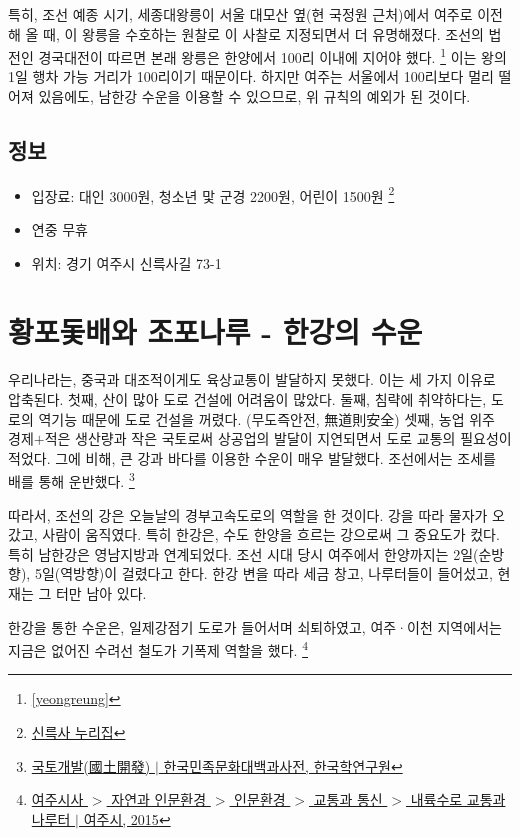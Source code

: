 특히, 조선 예종 시기, 세종대왕릉이 서울 대모산 옆(현 국정원 근처)에서 여주로 이전해 올 때,
이 왕릉을 수호하는 원찰로 이 사찰로 지정되면서 더 유명해졌다.
조선의 법전인 경국대전이 따르면 본래 왕릉은 한양에서 100리 이내에 지어야 했다. 
\footnote{\ref{yeongreung}}
이는 왕의 1일 행차 가능 거리가 100리이기 때문이다.
하지만 여주는 서울에서 100리보다 멀리 떨어져 있음에도, 남한강 수운을 이용할 수 있으므로,
위 규칙의 예외가 된 것이다.

\subsection{정보}
\begin{itemize}
    \item 입장료: 대인 3000원, 청소년 맟 군경 2200원, 어린이 1500원 
    \footnote{\href{http://www.silleuksa.org/}{신륵사 누리집}}
    \item 연중 무휴
    \item 위치: 경기 여주시 신륵사길 73-1
\end{itemize}

\section{황포돛배와 조포나루 - 한강의 수운}

우리나라는, 중국과 대조적이게도 육상교통이 발달하지 못했다. 이는 세 가지 이유로 압축된다.
첫째, 산이 많아 도로 건설에 어려움이 많았다. 
둘째, 침략에 취약하다는, 도로의 역기능 때문에 도로 건설을 꺼렸다. (무도즉안전, 無道則安全)
셋째, 농업 위주 경제$+$적은 생산량과 작은 국토로써 상공업의 발달이 지연되면서 도로 교통의 필요성이 적었다.
그에 비해, 큰 강과 바다를 이용한 수운이 매우 발달했다. 조선에서는 조세를 배를 통해 운반했다. 
\footnote{\href{http://encykorea.aks.ac.kr/Contents/Item/E0006539}{국토개발(國土開發) $|$ 한국민족문화대백과사전, 한국학연구원}}


따라서, 조선의 강은 오늘날의 경부고속도로의 역할을 한 것이다. 강을 따라 물자가 오갔고, 사람이 움직였다.
특히 한강은, 수도 한양을 흐르는 강으로써 그 중요도가 컸다. 특히 남한강은 영남지방과 연계되었다. 
조선 시대 당시 여주에서 한양까지는 2일(순방향), 5일(역방향)이 걸렸다고 한다.
한강 변을 따라 세금 창고, 나루터들이 들어섰고, 현재는 그 터만 남아 있다.


한강을 통한 수운은, 일제강점기 도로가 들어서며 쇠퇴하였고, 
여주·이천 지역에서는 지금은 없어진 수려선 철도가 기폭제 역할을 했다.
\footnote{ \href{https://www.yeoju.go.kr/history/jsp/Theme/Theme.jsp?BC_ID=a0085}{여주시사 $>$ 자연과 인문환경 $>$ 인문환경 $>$ 교통과 통신 $>$ 내륙수로 교통과 나루터 $|$ 여주시, 2015}}


